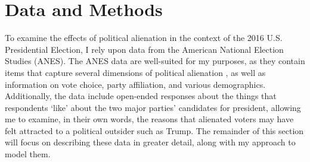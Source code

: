 \documentclass[12pt]{article}
\begin{document}












\section{Data and Methods}\label{sec:datamethods}
To examine the effects of political alienation in the context of the 2016 U.S. Presidential Election, I rely upon data from the American National Election Studies (ANES). The ANES data are well-suited for my purposes, as they contain items that capture several dimensions of political alienation \parencite{mason1985}, as well as information on vote choice, party affiliation, and various demographics. Additionally, the data include open-ended responses about the things that respondents `like' about the two major parties' candidates for president, allowing me to examine, in their own words, the reasons that alienated voters may have felt attracted to a political outsider such as Trump. The remainder of this section will focus on describing these data in greater detail, along with my approach to model them.  
\end{document}
